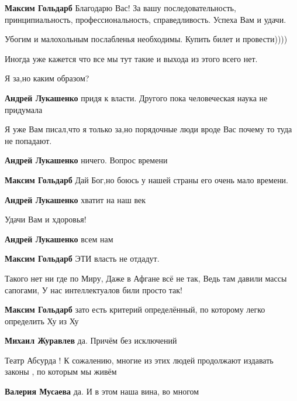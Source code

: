 \begin{itemize}
\begin{itemize}
\textbf{Максим Гольдарб} Благодарю Вас! За вашу последовательность, принципиальность, профессиональность, справедливость. Успеха Вам и удачи.

\end{itemize} %

Убогим и малохольным послабленья необходимы. Купить билет и провести))))

Иногда уже кажется что все мы тут такие и выхода из этого всего нет.

Я за,но каким образом?

\begin{itemize} %
\textbf{Андрей Лукашенко} придя к власти. Другого пока человеческая наука не придумала

Я уже Вам писал,что я только за,но порядочные люди вроде Вас почему то туда не попадают.

\textbf{Андрей Лукашенко} ничего. Вопрос времени

\textbf{Максим Гольдарб} Дай Бог,но боюсь у нашей страны его очень мало времени.

\textbf{Андрей Лукашенко} хватит на наш век

Удачи Вам и хдоровья!

\textbf{Андрей Лукашенко} всем нам

\textbf{Максим Гольдарб} ЭТИ власть не отдадут.
\end{itemize} %


\obeycr
Такого нет ни где по Миру,
Даже в Афгане всё не так,
Ведь там давили массы сапогами,
У нас интеллектуалов били просто так!
\restorecr

\textbf{Максим Гольдарб} зато есть критерий определённый, по которому легко определить Ху из Ху

\begin{itemize} %
\textbf{Михаил Журавлев} да. Причём без исключений
\end{itemize} %

Театр Абсурда ! К сожалению, многие из этих людей продолжают издавать законы , по которым мы живём

\begin{itemize} %
\textbf{Валерия Мусаева} да. И в этом наша вина, во многом


\end{itemize}
\end{itemize}
